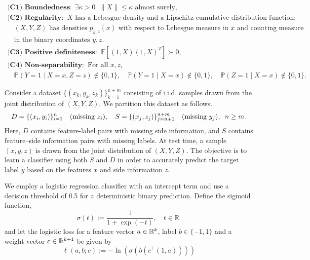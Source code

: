 \begin{equation} \label{eqn: distribution conditions}
\begin{array}{ll}
\textbf{(C1) Boundedness:} \ \ \exists \kappa>0  \;\; \lVert X \rVert \leq \kappa \text{ almost surely,} \\
\textbf{(C2) Regularity:} \;\; X \text{ has a Lebesgue density and a Lipschitz cumulative distribution function;}\\
\quad (X,Y,Z) \text{ has densities }p_{y,z}(x)\text{ with respect to Lebesgue measure in $x$ and counting measure} \\
\quad \text{in the binary coordinates $y,z$.}\\
\textbf{(C3) Positive definiteness:} \;\; \mathbb{E}[(1,X)(1,X)^T] \succ 0, \\
\textbf{(C4) Non-separability:} \;\; \text{For all } x, z, \\
 \quad \mathbb{P}(Y = 1 \mid X = x, Z = z) \not\in \{0,1\}, \quad \mathbb{P}(Y = 1 \mid X = x) \not\in \{0,1\}, \quad \mathbb{P}(Z = 1 \mid X = x) \not\in \{0,1\}.
\end{array}
\end{equation}

Consider a dataset $\{(x_k, y_k, z_k)\}_{k=1}^{n+m}$ consisting of i.i.d. samples drawn from the joint distribution of $(X, Y, Z)$. We partition this dataset as follows.
\begin{equation}\label{eqn: partitioned dataset}\index{Partitioned dataset|textbf}\index{Side information|textbf}
    \begin{aligned}
        D = \{(x_i, y_i)\}_{i=1}^n \quad \text{(missing  $z_i$\text)}, \quad S = \{(x_j, z_j)\}_{j=n+1}^{n+m} \quad \text{(missing $y_j$)}, \;\; n \ge m.
    \end{aligned}
\end{equation}
Here, $D$ contains feature-label pairs with missing side information, and $S$ contains feature–side information pairs with missing labels.
At test time, a sample $(x, y, z)$ is drawn from the joint distribution of $(X, Y, Z)$. The objective is to learn a classifier using both $S$ and $D$ in order to accurately predict the target label $y$ based on the features $x$ and side information $z$.

We employ a logistic regression classifier with an intercept term and use a decision threshold of 0.5 for a deterministic binary prediction. Define the sigmoid function,
\begin{equation*}
    \sigma(t) := \frac{1}{1 + \exp(-t)}, \quad t \in \mathbb{R}.
\end{equation*}
and let the logistic loss for a feature vector $a \in \mathbb{R}^k$, label $b \in \{-1,1\}$ and a weight vector $c \in \mathbb{R}^{k+1}$
be given by
\begin{equation*}
\ell(a,b;c) := -\ln(\sigma(b(c^\top(1,a))))
\end{equation*}

